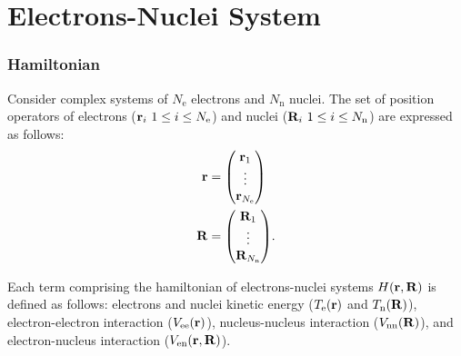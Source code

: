 \documentclass[../main]{subfiles}
\begin{document}
\part{Electrons-Nuclei System}
\section{Hamiltonian}
Consider complex systems of $N_\mathrm{e}$ electrons and $N_\mathrm{n}$ nuclei.
The set of position operators of electrons ($\vb{r}_i~1\leq i \leq N_\mathrm{e}$) and nuclei ($\vb{R}_i~1\leq i \leq N_\mathrm{n}$) are expressed as follows:
\begin{align}
    \vb{r} &= \mqty(\vb{r}_1 \\ \vdots \\ \vb{r}_{N_\mathrm{e}}) \\
    \vb{R} &= \mqty(\vb{R}_1 \\ \vdots \\ \vb{R}_{N_\mathrm{n}}).
\end{align}

Each term comprising the hamiltonian of electrons-nuclei systems $H(\vb{r}, \vb{R})$ is defined as follows: electrons and nuclei kinetic energy ($T_\mathrm{e}(\vb{r})$ and $T_\mathrm{n}(\vb{R})$), electron-electron interaction ($V_\mathrm{ee}(\vb{r})$), nucleus-nucleus interaction ($V_\mathrm{nn}(\vb{R})$), and electron-nucleus interaction ($V_\mathrm{en}(\vb{r},\vb{R})$). 
\end{document}
